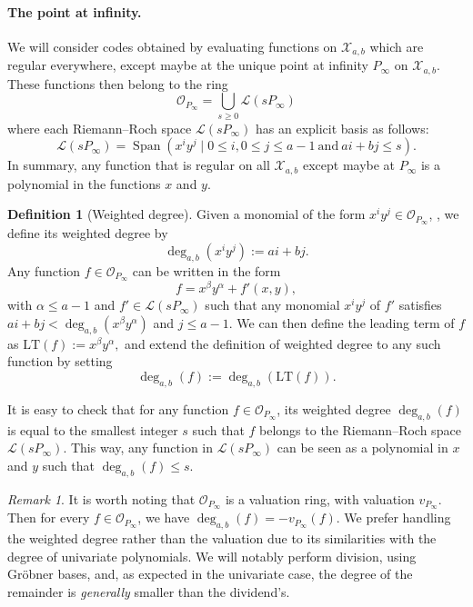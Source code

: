 \documentclass[a4paper]{article}
\theoremstyle{definition}
\newtheorem{definition}[thm]{Definition}
\theoremstyle{remark}
\newtheorem{remark}[thm]{Remark}
\newcommand{\calL}{\mathcal{L}}
\newcommand{\calO}{\mathcal{O}}
\newcommand{\calX}{\mathcal{X}}
\newcommand{\Span}[1]{\operatorname{Span}\left(#1\right)}
\newcommand{\degab}[1]{\deg_{a,b}\left(#1\right)}
\begin{document}
\paragraph{The point at infinity.} We will consider codes obtained by evaluating functions on $\calX_{a,b}$ which are regular everywhere, except maybe at the unique point at infinity $P_\infty$ on $\calX_{a,b}$. These functions then belong to the ring 
\begin{equation}\label{eq:O_Pinf}
\mathcal{O}_{P_\infty}=\bigcup_{s \geq 0} \calL(s P_\infty)
\end{equation} %
where each Riemann--Roch space $\calL(s P_\infty)$ has an explicit basis as follows:
\begin{equation} \label{eq:basis_L(sP_inf)}
    \calL(sP_{\infty}) = \Span{x^iy^j \mid 0 \leq i, 0\leq j\leq a-1 \ \mathrm{and} \ ai+bj \leq s}.
\end{equation}
%
In summary, any function that is regular on all $\calX_{a,b}$ except maybe at $P_\infty$ is a polynomial in the functions $x$ and $y$. 
\begin{definition}[Weighted degree]
Given a monomial of the form $x^iy^j \in \calO_{P_\infty}$, , we define its weighted degree by
\[ \degab{x^iy^j} := ai+bj.\]
%
Any function $f \in \calO_{P_\infty}$ can be written in the form $$f = x^{\beta}y^{\alpha} + f'(x,y),$$
with $\alpha \leq a-1$ and $f' \in \calL(sP_{\infty})$ such that any monomial $x^iy^j$ of $f'$ satisfies $ai+bj < \degab{x^{\beta}y^{\alpha}}$ and $j \leq a-1$. We can then define the leading term of $f$ as $\mathrm{LT}(f) := x^{\beta}y^{\alpha},$ and extend the definition of weighted degree to any such function by setting 
\[\degab{f} := \degab{\mathrm{LT}(f)}.\]
\end{definition}
It is easy to check that for any function $f \in \calO_{P_\infty}$, its weighted degree $\degab{f}$ is equal to the smallest integer $s$ such that $f$ belongs to the Riemann--Roch space $\calL(sP_{\infty})$.
%
This way, any function in $\calL(sP_\infty)$ can be seen as a polynomial in $x$ and $y$ such that $\degab{f}\leq s$. 
\begin{remark}
It is worth noting that $\calO_{P_\infty}$ is a valuation ring, with valuation $v_{P_\infty}$. Then for every $f \in \calO_{P_\infty}$, we have $\degab{f}=-v_{P_\infty}(f)$. We prefer handling the weighted degree rather than the valuation due to its similarities with the degree of univariate 
polynomials. We will notably perform division, using Gr\"obner bases, and, as expected in the univariate case, the degree of the remainder is 
\textit{generally} smaller than the dividend's.
\end{remark}
\end{document}

